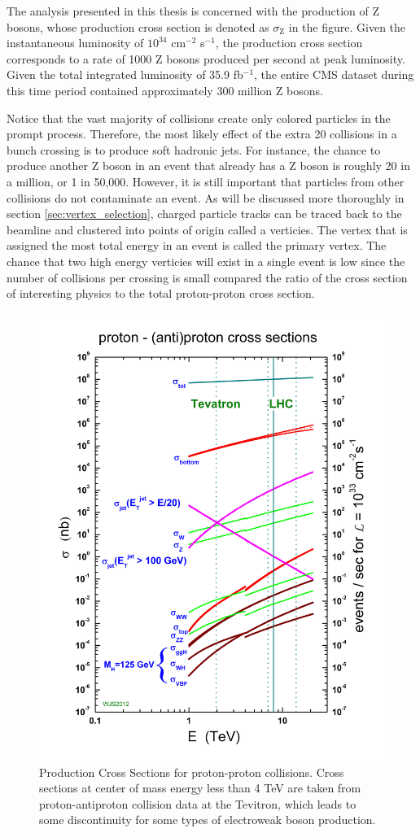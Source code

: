     The analysis presented in this thesis is concerned with the production of Z bosons, whose production cross section is denoted as $\sigma_\text{Z}$ in the figure. Given the instantaneous luminosity of $10^{34}$ cm$^{-2}$ s$^{-1}$, the production cross section corresponds to a rate of 1000 Z bosons produced per second at peak luminosity. Given the total integrated luminosity of 35.9 fb$^{-1}$, the entire CMS dataset during this time period contained approximately 300 million Z bosons.

    Notice that the vast majority of collisions create only colored particles in the prompt process. Therefore, the most likely effect of the extra 20 collisions in a bunch crossing is to produce soft hadronic jets. For instance, the chance to produce another Z boson in an event that already has a Z boson is roughly 20 in a million, or 1 in 50,000. However, it is still important that particles from other collisions do not contaminate an event. As will be discussed more thoroughly in section \ref{sec:vertex_selection}, charged particle tracks can be traced back to the beamline and clustered into points of origin called a verticies. The vertex that is assigned the most total energy in an event is called the primary vertex. The chance that two high energy verticies will exist in a single event is low since the number of collisions per crossing is small compared the ratio of the cross section of interesting physics to the total proton-proton cross section.


    \begin{figure}[h!]
      \centering
      \includegraphics[width=.7\textwidth]{figures/lhc_decay_modes.jpg}
      \caption{Production Cross Sections for proton-proton collisions. Cross sections at center of mass energy less than 4 TeV are taken from proton-antiproton collision data at the Tevitron, which leads to some discontinuity for some types of electroweak boson production.}
      \label{fig:lhc_decay_modes}
    \end{figure}

